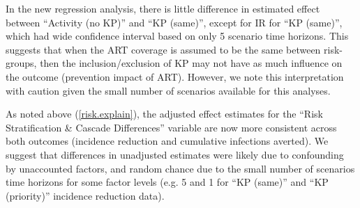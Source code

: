 \begin{response}
In the new regression analysis, there is little difference in estimated effect between ``Activity (no KP)'' and ``KP (same)'',
except for IR for ``KP (same)'', which had wide confidence interval based on only 5 scenario time horizons.
This suggests that when the ART coverage is assumed to be the same between risk-groups,
then the inclusion/exclusion of KP may not have as much influence on the outcome (prevention impact of ART).
However, we note this interpretation with caution given the small number of scenarios available for this analyses.
\end{response}
\begin{comment}
Please elaborate on and support Figure C.11 - it's not immediately clear to me that 'the pattern of incidence reduction versus modelled heterogeneity was similar to the pattern of infections averted versus modelled heterogeneity". Recognising that these data do not stem from the same studies, it is noted that in Table C.1 the incidence reduction increases ~2fold between no risk heterogeneity and activity (no KP), whilst averted infections decreases \textasciitilde4 fold. This would appear to be a key difference?
\end{comment}
\begin{response}
As noted above (\ref{risk.explain}), the adjusted effect estimates for
the ``Risk Stratification \& Cascade Differences'' variable are now more consistent across both outcomes
(incidence reduction and cumulative infections averted).
We suggest that differences in unadjusted estimates were likely due to confounding by unaccounted factors,
and random chance due to the small number of scenarios time horizons for some factor levels
(e.g. 5 and 1 for ``KP (same)'' and ``KP (priority)'' incidence reduction data).
\end{response}
\begin{comment}
As HIV prevalence is linked to epidemic type, it's interesting that ART prevention impacts were larger with lower HIV prevalence. As the lower prevalence epidemics in West Africa are driven by KPs/more so than the epidemics in ESA, I assume that modelling studies in West Africa are more likely to be KP-disaggregated. However, you have shown that KP-disaggregated models estimate smaller ART prevention impacts. Could this be explored further?
\end{comment}

